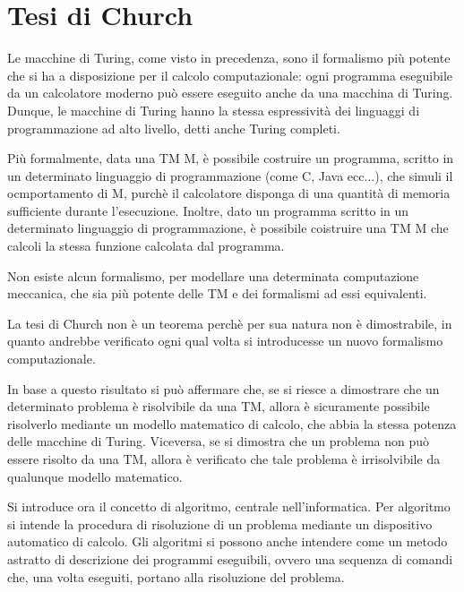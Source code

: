   \section{Tesi di Church}
  Le macchine di Turing, come visto in precedenza, sono il formalismo più potente che si ha a disposizione per il calcolo computazionale: ogni programma eseguibile da un calcolatore moderno può essere eseguito anche da una macchina di Turing. Dunque, le macchine di Turing hanno la stessa espressività dei linguaggi di programmazione ad alto livello, detti anche Turing completi. 

  Più formalmente, data una TM M, è possibile costruire un programma, scritto in un determinato linguaggio di programmazione (come C, Java ecc...), che simuli il ocmportamento di M, purchè il calcolatore disponga di una quantità di memoria sufficiente durante l'esecuzione. Inoltre, dato un programma scritto in un determinato linguaggio di programmazione, è possibile coistruire una TM M che calcoli la stessa funzione calcolata dal programma.

  \begin{thesis}
    Non esiste alcun formalismo, per modellare una determinata computazione meccanica, che sia più potente delle TM e dei formalismi ad essi equivalenti.
  \end{thesis}

  La tesi di Church non è un teorema perchè per sua natura non è dimostrabile, in quanto andrebbe verificato ogni qual volta si introducesse un nuovo formalismo computazionale.

  In base a questo risultato si può affermare che, se si riesce a dimostrare che un determinato problema è risolvibile da una TM, allora è sicuramente possibile risolverlo mediante un modello matematico di calcolo, che abbia la stessa potenza delle macchine di Turing. Viceversa, se si dimostra che un problema non può essere risolto da una TM, allora è verificato che tale problema è irrisolvibile da qualunque modello matematico.

  Si introduce ora il concetto di algoritmo, centrale nell'informatica. Per algoritmo si intende la procedura di risoluzione di un problema mediante un dispositivo automatico di calcolo. Gli algoritmi si possono anche intendere come un metodo astratto di descrizione dei programmi eseguibili, ovvero una sequenza di comandi che, una volta eseguiti, portano alla risoluzione del problema.
  
